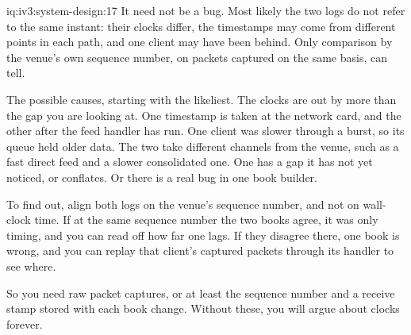 \begin{solution}{iq:iv3:system-design:17}
It need not be a bug. Most likely the two logs do not refer to the same instant: their clocks differ, the timestamps may come from different points in each path, and one client may have been behind. Only comparison by the venue's own sequence number, on packets captured on the same basis, can tell.

The possible causes, starting with the likeliest. The clocks are out by more than the gap you are looking at. One timestamp is taken at the network card, and the other after the feed handler has run. One client was slower through a burst, so its queue held older data. The two take different channels from the venue, such as a fast direct feed and a slower consolidated one. One has a gap it has not yet noticed, or conflates. Or there is a real bug in one book builder.

To find out, align both logs on the venue's sequence number, and not on wall-clock time. If at the same sequence number the two books agree, it was only timing, and you can read off how far one lags. If they disagree there, one book is wrong, and you can replay that client's captured packets through its handler to see where.

So you need raw packet captures, or at least the sequence number and a receive stamp stored with each book change. Without these, you will argue about clocks forever.

\end{solution}


